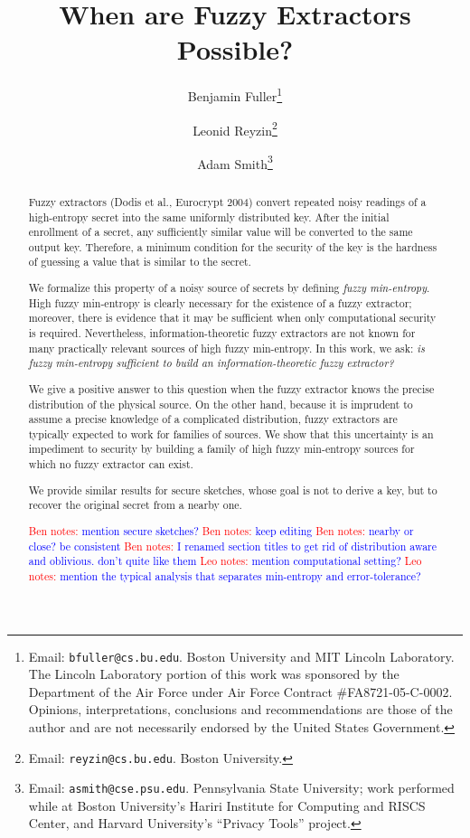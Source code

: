 \documentclass[11pt]{article}
\title{When are Fuzzy Extractors Possible?}
\author{
Benjamin Fuller\footnote{Email: {\tt bfuller@cs.bu.edu}.  Boston University and MIT Lincoln Laboratory. The Lincoln Laboratory portion of this work was sponsored by the Department of the Air Force under Air Force Contract \#FA8721-05-C-0002.  Opinions, interpretations, conclusions and recommendations are those of the author and are not necessarily endorsed by the United States Government.}  \and Leonid Reyzin\footnote{Email: {\tt reyzin@cs.bu.edu}.  Boston University.} \and Adam Smith\footnote{Email: {\tt asmith@cse.psu.edu}.  Pennsylvania State University; work performed while at Boston University's Hariri Institute for Computing and RISCS Center, and Harvard University's
``Privacy Tools'' project.}}
\newcommand{\authnote}[2]{{\textcolor{red}{\textsf{#1 notes: }\textcolor{blue}{ #2}}\marginpar{\textcolor{red}{\textbf{!!!!!}}}}}
\newcommand{\authnote}[2]{}
\newcommand{\bnote}[1]{{\authnote{Ben}{#1}}}
\newcommand{\lnote}[1]{{\authnote{Leo}{#1}}}
\begin{document}
\maketitle

\begin{abstract}
Fuzzy extractors (Dodis et al., Eurocrypt 2004) convert repeated noisy readings of a high-entropy secret into the same uniformly distributed key. After the initial enrollment of a secret, any sufficiently similar value will be converted to the same output key. Therefore, a minimum condition for the security of the key is the hardness of guessing a value that is similar to the secret. 

We formalize this property of a noisy source of secrets by defining \emph{fuzzy min-entropy}. High fuzzy min-entropy is clearly necessary for the existence of a fuzzy extractor; moreover, there is evidence that it may be sufficient when only computational security is required. Nevertheless, information-theoretic fuzzy extractors are not known for many practically relevant sources of high fuzzy min-entropy. In this work, we ask: \emph{is fuzzy min-entropy sufficient to build an information-theoretic fuzzy extractor?} 

We give a positive answer to this question when the fuzzy extractor knows the precise distribution of the physical source.  On the other hand, because it is imprudent to assume a precise knowledge of a complicated distribution,  fuzzy extractors are typically expected to work for families of sources. We show that this uncertainty is an impediment to security by building a family of high fuzzy min-entropy sources for which no fuzzy extractor can exist.

We provide similar results for secure sketches, whose goal is not to derive a key, but to recover the original secret from a nearby one.

\bnote{mention secure sketches?}
\bnote{keep editing}
\bnote{nearby or close?  be consistent}
\bnote{I renamed section titles to get rid of distribution aware and oblivious.  don't quite like them}
\lnote{mention computational setting?}
\lnote{mention the typical analysis that separates min-entropy and error-tolerance?}
\end{abstract}
\end{document}
